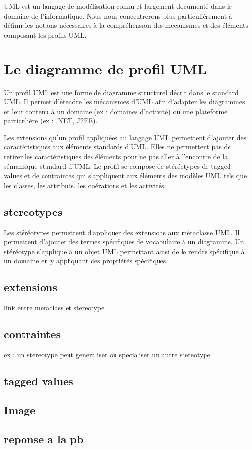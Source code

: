 UML est un langage de modélisation connu et largement documenté dans le domaine de l'informatique.
Nous nous concentrerons plus particulièrement à définir les notions nécessaires à la compréhension des mécanismes et des éléments composant les profils UML.

\section{Le diagramme de profil UML}
Un profil UML est une forme de diagramme structurel décrit dans le standard UML. 
Il permet d'étendre les mécanismes d'UML afin d'adapter les diagrammes et leur contenu à un domaine (ex : domaines d'activité) ou une plateforme particulière (ex : .NET, J2EE). 

Les extensions qu'un profil appliquées au langage UML permettent d'ajouter des caractéristiques aux éléments standards d'UML. 
Elles ne permettent pas de retirer les caractéristiques des éléments pour ne pas aller à l'encontre de la sémantique standard d'UML.
Le profil se compose  de stéréotypes de tagged values et de contraintes qui s'appliquent aux éléments des modèles UML tels que les classes, les attributs, les opérations et les activités.


\subsection{stereotypes}
Les stéréotypes permettent d'appliquer des extensions aux métaclasse UML. 
Il permettent d'ajouter des termes spécifiques de vocabulaire à un diagramme. 
Un stéréotype s'applique à un objet UML permettant ainsi de le rendre spécifique à un domaine en y appliquant des propriétés spécifiques.

\subsection{extensions}
link entre metaclass et stereotype


\subsection{contraintes}
ex : un stereotype peut generaliser ou specialiser un autre stereotype


\subsection{tagged values}


\subsection{Image}


\subsection{reponse a la pb}

